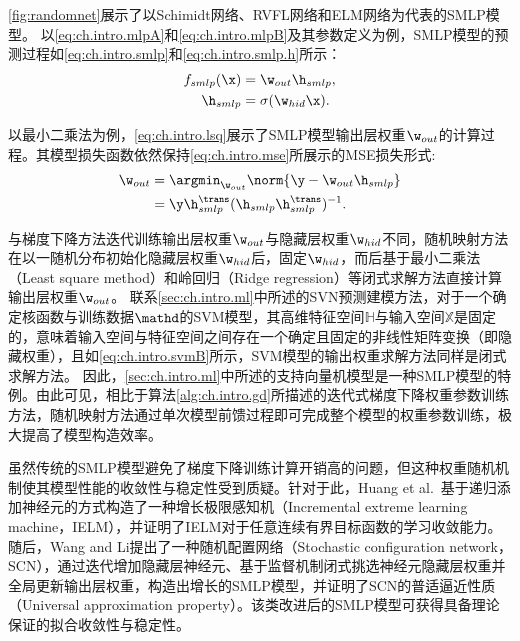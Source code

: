\autoref{fig:randomnet}展示了以Schimidt网络、RVFL网络和ELM网络为代表的SMLP模型。
以\autoref{eq:ch.intro.mlpA}和\autoref{eq:ch.intro.mlpB}及其参数定义为例，SMLP模型的预测过程如\autoref{eq:ch.intro.smlp}和\autoref{eq:ch.intro.smlp.h}所示：
\begin{align}
    f_{smlp}(\x) &= \w_{out}\h_{smlp}, \label{eq:ch.intro.smlp}\\
    \h_{smlp} &= \sigma (\w_{hid}\x). \label{eq:ch.intro.smlp.h}
\end{align}

以最小二乘法为例，\autoref{eq:ch.intro.lsq}展示了SMLP模型输出层权重\(\w_{out}\)的计算过程。其模型损失函数依然保持\autoref{eq:ch.intro.mse}所展示的MSE损失形式:
\begin{align}
    \w_{out} &= \argmin_{\w_{out}} \norm{\y - \w_{out}\h_{smlp}} \label{eq:ch.intro.lsq}\\ 
    & = \y \h_{smlp}^{\trans} (\h_{smlp}\h_{smlp}^\trans)^{-1}. \notag
\end{align}


与梯度下降方法迭代训练输出层权重\(\w_{out}\)与隐藏层权重\(\w_{hid}\)不同，随机映射方法在以一随机分布初始化隐藏层权重\(\w_{hid}\)后，固定\(\w_{hid}\)，而后基于最小二乘法（Least square method）和岭回归（Ridge regression）等闭式求解方法直接计算输出层权重\(\w_{out}\)。
联系\autoref{sec:ch.intro.ml}中所述的SVN预测建模方法，对于一个确定核函数与训练数据\(\mathd\)的SVM模型，其高维特征空间\(\mathbb{H}\)与输入空间\(\mathbb{X}\)是固定的，意味着输入空间与特征空间之间存在一个确定且固定的非线性矩阵变换（即隐藏权重），且如\autoref{eq:ch.intro.svmB}所示，SVM模型的输出权重求解方法同样是闭式求解方法。
因此，\autoref{sec:ch.intro.ml}中所述的支持向量机模型是一种SMLP模型的特例\cite{vapnikNature2013}。由此可见，相比于算法\ref{alg:ch.intro.gd}所描述的迭代式梯度下降权重参数训练方法，随机映射方法通过单次模型前馈过程即可完成整个模型的权重参数训练，极大提高了模型构造效率。

虽然传统的SMLP模型避免了梯度下降训练计算开销高的问题，但这种权重随机机制使其模型性能的收敛性与稳定性受到质疑。针对于此，Huang et al.~\cite{huang2006universal}基于递归添加神经元的方式构造了一种增长极限感知机（Incremental extreme learning machine，IELM），并证明了IELM对于任意连续有界目标函数的学习收敛能力。
随后，Wang and Li\cite{wang2017stochastic}提出了一种随机配置网络（Stochastic configuration network，SCN），通过迭代增加隐藏层神经元、基于监督机制闭式挑选神经元隐藏层权重并全局更新输出层权重，构造出增长的SMLP模型，并证明了SCN的普适逼近性质（Universal approximation property）。该类改进后的SMLP模型可获得具备理论保证的拟合收敛性与稳定性。

